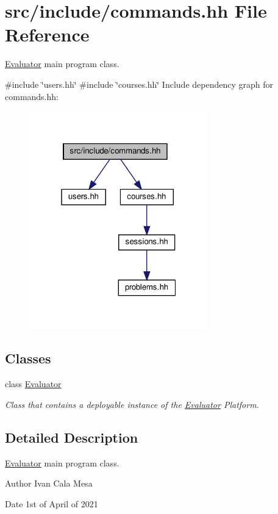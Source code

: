 \hypertarget{commands_8hh}{}\section{src/include/commands.hh File Reference}
\label{commands_8hh}


\hyperlink{classEvaluator}{Evaluator} main program class.  


{\ttfamily \#include \char`\"{}users.\+hh\char`\"{}}\newline
{\ttfamily \#include \char`\"{}courses.\+hh\char`\"{}}\newline
Include dependency graph for commands.\+hh\+:
\nopagebreak
\begin{figure}[H]
\begin{center}
\leavevmode
\includegraphics[width=220pt]{commands_8hh__incl}
\end{center}
\end{figure}
\subsection*{Classes}
\begin{DoxyCompactItemize}
\item 
class \hyperlink{classEvaluator}{Evaluator}
\begin{DoxyCompactList}\small\item\em Class that contains a deployable instance of the \hyperlink{classEvaluator}{Evaluator} Platform. \end{DoxyCompactList}\end{DoxyCompactItemize}


\subsection{Detailed Description}
\hyperlink{classEvaluator}{Evaluator} main program class. 

\begin{DoxyAuthor}{Author}
Ivan Cala Mesa 
\end{DoxyAuthor}
\begin{DoxyDate}{Date}
1st of April of 2021 
\end{DoxyDate}

